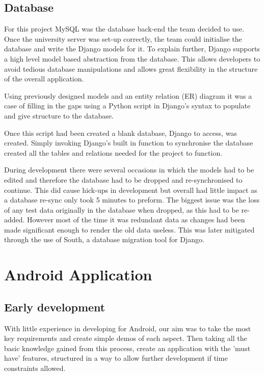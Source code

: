 \documentclass{l3proj}
\begin{document}
\subsection{Database}
For this project \gls{MySQL} was the database back-end the team decided to use. Once the university server was set-up correctly, the team could initialise the database and write the Django models for it. To explain further, Django supports a high level model based abstraction from the database. This allows developers to avoid tedious database manipulations and allows great flexibility in the structure of the overall application.

Using previously designed models and an entity relation (ER) diagram it was a case of filling in the gaps using a \gls{Python} script in Django's syntax to populate and give structure to the database.

Once this script had been created a blank database, Django to access, was created. Simply invoking Django's built in function to synchronise the database created all the tables and relations needed for the project to function.

During development there were several occasions in which the models had to be edited and therefore the database had to be dropped and re-synchronised to continue. This did cause hick-ups in development but overall had little impact as a database re-sync only took 5 minutes to preform. The biggest issue was the loss of any test data originally in the database when dropped, as this had to be re-added. However most of the time it was redundant data as changes had been made significant enough to render the old data useless. This was later mitigated through the use of South, a database migration tool for Django.
\section{Android Application}

\subsection{Early development} With little experience in developing for Android, our aim was to take the most key requirements and create simple demos of each aspect. Then taking all the basic knowledge gained from this process, create an application with the 'must have' features, structured in a way to allow further development if time constraints allowed.
\end{document}
